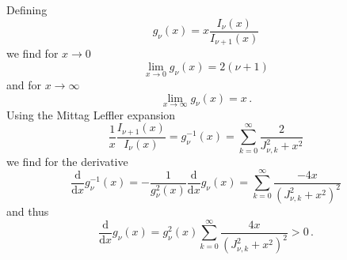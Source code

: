 \documentclass[superscriptaddress,prb]{revtex4-1}
\begin{document}
Defining
\begin{equation}
g_\nu(x) = x \frac{I_\nu(x)}{I_{\nu+1}(x)}
\end{equation}
we find for $x\to0$
\begin{equation}
\lim_{x\to0} g_\nu(x) = 2(\nu+1)
\end{equation}
and for $x\to\infty$
\begin{equation}
\lim_{x\to\infty} g_\nu(x) = x \,.
\end{equation}
Using the Mittag Leffler expansion
\begin{equation}
\frac{1}{x} \frac{I_{\nu+1}(x)}{I_\nu(x)} = g_\nu^{-1}(x) = \sum_{k=0}^\infty \frac{2}{J_{\nu,k}^2+x^2}
\end{equation}
we find for the derivative
\begin{equation}
\frac{\mathrm{d}}{\mathrm{d}x} g_\nu^{-1}(x) = -\frac{1}{g_\nu^2(x)} \frac{\mathrm{d}}{\mathrm{d}x} g_\nu(x) = \sum_{k=0}^\infty \frac{-4x}{\left(J_{\nu,k}^2+x^2\right)^2}
\end{equation}
and thus
\begin{equation}
\frac{\mathrm{d}}{\mathrm{d}x} g_\nu(x) = g_\nu^2(x) \sum_{k=0}^\infty \frac{4x}{(J^2_{\nu,k}+x^2)^2} > 0 \,.
\end{equation}
\end{document}
